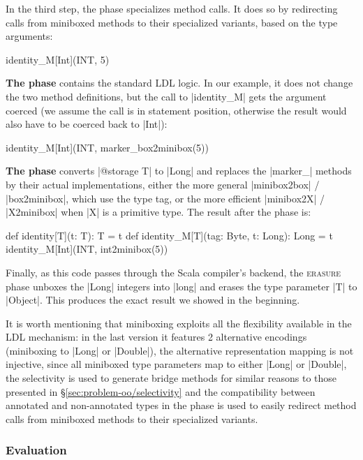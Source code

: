 In the third step, the \inject{} phase specializes method calls. It does so by redirecting calls from miniboxed methods to their specialized variants, based on the type arguments:

\begin{lstlisting-nobreak}
 identity_M[Int](INT, 5)
\end{lstlisting-nobreak}

\textbf{The \coerce{} phase} contains the standard LDL logic. In our example, it does not change the two method definitions, but the call to |identity_M| gets the argument coerced (we assume the call is in statement position, otherwise the result would also have to be coerced back to |Int|):

\begin{lstlisting-nobreak}
 identity_M[Int](INT, marker_box2minibox(5))
\end{lstlisting-nobreak}

\textbf{The \commit{} phase} converts |@storage T| to |Long| and replaces the |marker_| methods by their actual implementations, either the more general |minibox2box| / |box2minibox|, which use the type tag, or the more efficient |minibox2X| / |X2minibox| when |X| is a primitive type. The result after the \commit{} phase is:

\begin{lstlisting-nobreak}
 def identity[T](t: T): T = t
 def identity_M[T](tag: Byte, t: Long): Long = t
 identity_M[Int](INT, int2minibox(5))
\end{lstlisting-nobreak}

Finally, as this code passes through the Scala compiler's backend, the \textsc{erasure} phase unboxes the |Long| integers into |long| and erases the type parameter |T| to |Object|. This produces the exact result we showed in the beginning.

It is worth mentioning that miniboxing exploits all the flexibility available in the LDL mechanism: in the last version it features 2 alternative encodings (miniboxing to |Long| or |Double|), the alternative representation mapping is not injective, since all miniboxed type parameters map to either |Long| or |Double|, the selectivity is used to generate bridge methods for similar reasons to those presented in \S\ref{sec:problem-oo/selectivity} and the compatibility between annotated and non-annotated types in the \inject{} phase is used to easily redirect method calls from miniboxed methods to their specialized variants.

\subsubsection*{Evaluation}

